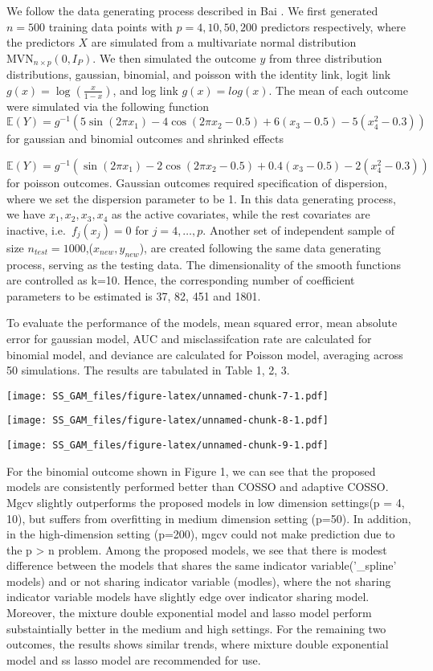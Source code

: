 \documentclass[AMA,STIX1COL,]{WileyNJD-v2}
\begin{document}
We follow the data generating process described in Bai \citep{Bai2021}.
We first generated \(n=500\) training data points with
\(p=4, 10, 50, 200\) predictors respectively, where the predictors \(X\)
are simulated from a multivariate normal distribution
\(\text{MVN}_{n\times p}(0, I_{P})\). We then simulated the outcome
\(y\) from three distribution distributions, gaussian, binomial, and
poisson with the identity link, logit link
\(g(x) = \log(\frac{x}{1-x})\), and log link \(g(x) = log(x)\). The mean
of each outcome were simulated via the following function \[
\mathbb{E}(Y) = g^{-1}(5 \sin(2\pi x_1) - 4 \cos(2\pi x_2 -0.5) + 6(x_3-0.5) - 5(x_4^2 -0.3))
\] for gaussian and binomial outcomes and shrinked effects

\[
\mathbb{E}(Y) = g^{-1}(\sin(2\pi x_1) - 2\cos(2\pi x_2 -0.5) + 0.4(x_3-0.5) - 2(x_4^2 -0.3))
\] for poisson outcomes. Gaussian outcomes required specification of
dispersion, where we set the dispersion parameter to be 1. In this data
generating process, we have \(x_1, x_2, x_3, x_4\) as the active
covariates, while the rest covariates are inactive,
i.e.~\(f_j(x_j) = 0\) for \(j = 4, \dots, p\). Another set of
independent sample of size \(n_{test}=1000\),(\(x_{new} ,y_{new}\)), are
created following the same data generating process, serving as the
testing data. The dimensionality of the smooth functions are controlled
as k=10. Hence, the corresponding number of coefficient parameters to be
estimated is 37, 82, 451 and 1801.

To evaluate the performance of the models, mean squared error, mean
absolute error for gaussian model, AUC and misclassifcation rate are
calculated for binomial model, and deviance are calculated for Poisson
model, averaging across 50 simulations. The results are tabulated in
Table 1, 2, 3.

\texttt{[image: SS\_GAM\_files/figure-latex/unnamed-chunk-7-1.pdf]}

\texttt{[image: SS\_GAM\_files/figure-latex/unnamed-chunk-8-1.pdf]}

\texttt{[image: SS\_GAM\_files/figure-latex/unnamed-chunk-9-1.pdf]}

For the binomial outcome shown in Figure 1, we can see that the proposed
models are consistently performed better than COSSO and adaptive COSSO.
Mgcv slightly outperforms the proposed models in low dimension
settings(p = 4, 10), but suffers from overfitting in medium dimension
setting (p=50). In addition, in the high-dimension setting (p=200), mgcv
could not make prediction due to the p \textgreater{} n problem. Among
the proposed models, we see that there is modest difference between the
models that shares the same indicator variable('\_spline' models) and or
not sharing indicator variable (modles), where the not sharing indicator
variable models have slightly edge over indicator sharing model.
Moreover, the mixture double exponential model and lasso model perform
substaintially better in the medium and high settings. For the remaining
two outcomes, the results shows similar trends, where mixture double
exponential model and ss lasso model are recommended for use.
\end{document}
